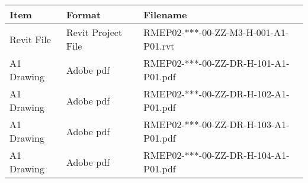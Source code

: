 \begin{tabular}{|l|l|l|}
	\hline
	\textbf{Item} & \textbf{Format} & \textbf{Filename} \\
	\hline
	Revit File  & Revit Project File & RMEP02-***-00-ZZ-M3-H-001-A1-P01.rvt  \\
	A1 Drawing  & Adobe pdf & RMEP02-***-00-ZZ-DR-H-101-A1-P01.pdf  \\
	A1 Drawing  & Adobe pdf & RMEP02-***-00-ZZ-DR-H-102-A1-P01.pdf  \\
	A1 Drawing  & Adobe pdf & RMEP02-***-00-ZZ-DR-H-103-A1-P01.pdf  \\
	A1 Drawing  & Adobe pdf & RMEP02-***-00-ZZ-DR-H-104-A1-P01.pdf  \\
	\hline
\end{tabular}



